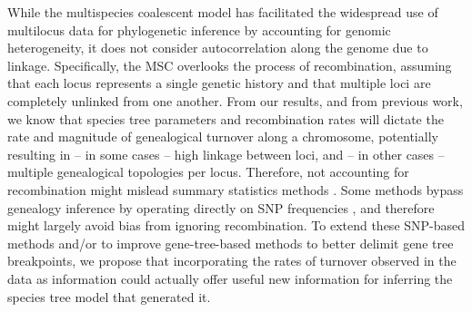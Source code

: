 \documentclass[11pt]{article}
\begin{document}
While the multispecies coalescent model has facilitated the widespread 
use of multilocus data for phylogenetic inference by accounting for genomic heterogeneity, 
it does not consider autocorrelation along the genome due to linkage.
Specifically, the MSC overlooks the process of recombination, assuming that each locus 
represents a single genetic history and that multiple loci are completely unlinked from one another. 
From our results, and from previous work, we know that species tree parameters and recombination 
rates will dictate the rate and magnitude of genealogical turnover along a chromosome, 
potentially resulting in -- in some cases -- high linkage between loci, and 
-- in other cases -- multiple genealogical topologies 
per locus. Therefore, not accounting for recombination might mislead 
summary statistics methods \citep{liu2010maximum,gatesy_concatenation_2013,zhang2018astral}. 
Some methods bypass genealogy inference by operating directly on SNP 
frequencies \citep{bryant2012inferring,chifman2014quartet,vachaspati2018svdquest}, 
and therefore might largely avoid bias from ignoring recombination. 
To extend these SNP-based methods and/or to improve gene-tree-based methods to better delimit gene tree breakpoints, 
we propose that incorporating the rates of turnover observed in the data as 
information could actually offer useful new information for inferring the species tree 
model that generated it. 
\end{document}
